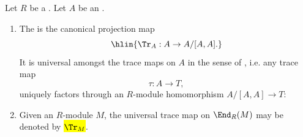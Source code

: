 \begin{definition} \label{definition:universal_trace_map_on_an_algebra_over_a_ring}
Let $R$ be a . Let $A$ be an .
\begin{enumerate}
    \item The  is the canonical projection map 
        $$\hlin{\Tr_A: A \to A / [A, A].}$$
        It is universal amongst the trace maps on $A$ in the sense of , i.e. any trace map 
        $$\tau: A \to T,$$
        uniquely factors through an $R$-module homomorphism $A / [A, A] \to T$: 
        \begin{center}
        \end{center}

    \item Given an $R$-module $M$, the universal trace map on $\End_R(M)$ may be denoted by \hl{$\Tr_M$}.
\end{enumerate}
\end{definition}